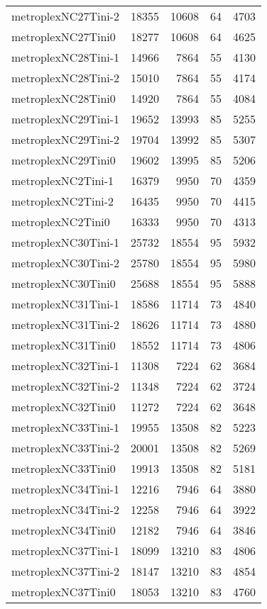 \begin{tabular}{lrrrr}
metroplexNC27Tini-2 & 18355 & 10608 & 64 & 4703 \\
metroplexNC27Tini0 & 18277 & 10608 & 64 & 4625 \\
metroplexNC28Tini-1 & 14966 & 7864 & 55 & 4130 \\
metroplexNC28Tini-2 & 15010 & 7864 & 55 & 4174 \\
metroplexNC28Tini0 & 14920 & 7864 & 55 & 4084 \\
metroplexNC29Tini-1 & 19652 & 13993 & 85 & 5255 \\
metroplexNC29Tini-2 & 19704 & 13992 & 85 & 5307 \\
metroplexNC29Tini0 & 19602 & 13995 & 85 & 5206 \\
metroplexNC2Tini-1 & 16379 & 9950 & 70 & 4359 \\
metroplexNC2Tini-2 & 16435 & 9950 & 70 & 4415 \\
metroplexNC2Tini0 & 16333 & 9950 & 70 & 4313 \\
metroplexNC30Tini-1 & 25732 & 18554 & 95 & 5932 \\
metroplexNC30Tini-2 & 25780 & 18554 & 95 & 5980 \\
metroplexNC30Tini0 & 25688 & 18554 & 95 & 5888 \\
metroplexNC31Tini-1 & 18586 & 11714 & 73 & 4840 \\
metroplexNC31Tini-2 & 18626 & 11714 & 73 & 4880 \\
metroplexNC31Tini0 & 18552 & 11714 & 73 & 4806 \\
metroplexNC32Tini-1 & 11308 & 7224 & 62 & 3684 \\
metroplexNC32Tini-2 & 11348 & 7224 & 62 & 3724 \\
metroplexNC32Tini0 & 11272 & 7224 & 62 & 3648 \\
metroplexNC33Tini-1 & 19955 & 13508 & 82 & 5223 \\
metroplexNC33Tini-2 & 20001 & 13508 & 82 & 5269 \\
metroplexNC33Tini0 & 19913 & 13508 & 82 & 5181 \\
metroplexNC34Tini-1 & 12216 & 7946 & 64 & 3880 \\
metroplexNC34Tini-2 & 12258 & 7946 & 64 & 3922 \\
metroplexNC34Tini0 & 12182 & 7946 & 64 & 3846 \\
metroplexNC37Tini-1 & 18099 & 13210 & 83 & 4806 \\
metroplexNC37Tini-2 & 18147 & 13210 & 83 & 4854 \\
metroplexNC37Tini0 & 18053 & 13210 & 83 & 4760 \\

\end{tabular}
